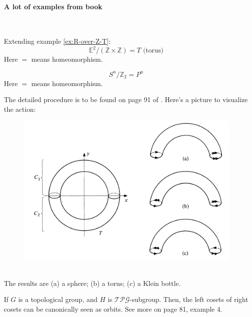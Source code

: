 \documentclass{article}
\begin{document}
\paragraph{A lot of examples from book \cite{book}}$ $

\begin{ex}
    Extending example \ref{ex:R-over-Z-T}:
\begin{equation}
    \mathbb{E}^2/(\mathbb{Z}\times\mathbb{Z}) = T\text{ (torus)}
\end{equation}
    Here $=$ means homeomorphism.
\end{ex}
\begin{ex}
    \begin{equation}
        S^n/\mathbb{Z}_2 = P^n
    \end{equation}
    Here $=$ means homeomorphism.
\end{ex}
\begin{ex}
    The detailed procedure is to be found on page 91 of \cite{book}.
    Here's a picture to visualize the action:
    \begin{figure}[H]
        \centering
        \includegraphics[width=0.8\linewidth]{pics/3-ways-Z2-on-T.PNG}
        \caption{$ $}
    \end{figure}
    The results are (a) a sphere; (b) a torus; (c) a Klein bottle.
\end{ex}
\begin{ex}
    If $G$ is a topological group, and $H$ is
    $\mathcal{TPG}$-subgroup. Then, the left cosets of right cosets
    can be canonically seen as orbits. See more on page 81, example 4.
\end{ex}
\end{document}
